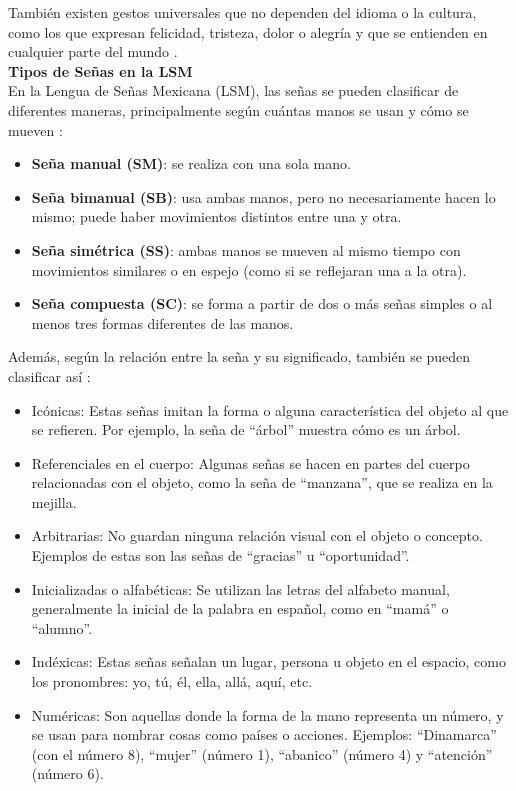 También existen gestos universales que no dependen del idioma o la cultura, como los que expresan felicidad, tristeza, dolor o alegría y que se entienden en cualquier parte del mundo \cite{ref37}.\\

\textbf{Tipos de Señas en la LSM}\\
En la Lengua de Señas Mexicana (LSM), las señas se pueden clasificar de diferentes maneras, principalmente según cuántas manos se usan y cómo se mueven \cite{ref37}:

\begin{itemize}
    \item \textbf{Seña manual (SM)}: se realiza con una sola mano.
    \item \textbf{Seña bimanual (SB)}: usa ambas manos, pero no necesariamente hacen lo mismo; puede haber movimientos distintos entre una y otra.
    \item \textbf{Seña simétrica (SS)}: ambas manos se mueven al mismo tiempo con movimientos similares o en espejo (como si se reflejaran una a la otra).
    \item \textbf{Seña compuesta (SC)}: se forma a partir de dos o más señas simples o al menos tres formas diferentes de las manos.
\end{itemize}

\newpage
Además, según la relación entre la seña y su significado, también se pueden clasificar así \cite{ref37}:
\begin{itemize}
    \item Icónicas: Estas señas imitan la forma o alguna característica del objeto al que se refieren. Por ejemplo, la seña de “árbol” muestra cómo es un árbol.
    \item Referenciales en el cuerpo: Algunas señas se hacen en partes del cuerpo relacionadas con el objeto, como la seña de “manzana”, que se realiza en la mejilla.
    \item Arbitrarias: No guardan ninguna relación visual con el objeto o concepto. Ejemplos de estas son las señas de “gracias” u “oportunidad”.
    \item Inicializadas o alfabéticas: Se utilizan las letras del alfabeto manual, generalmente la inicial de la palabra en español, como en “mamá” o “alumno”.
    \item Indéxicas: Estas señas señalan un lugar, persona u objeto en el espacio, como los pronombres: yo, tú, él, ella, allá, aquí, etc.
    \item Numéricas: Son aquellas donde la forma de la mano representa un número, y se usan para nombrar cosas como países o acciones. Ejemplos: “Dinamarca” (con el número 8), “mujer” (número 1), “abanico” (número 4) y “atención” (número 6).\\
\end{itemize}

